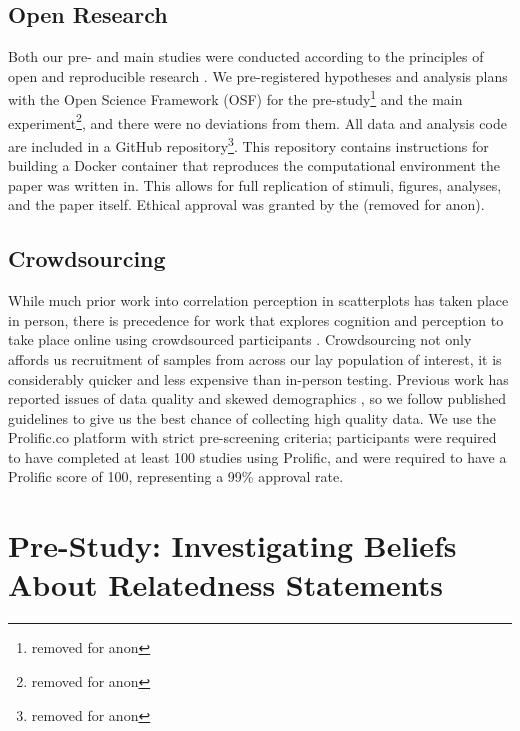 \documentclass[manuscript,screen,review,anonymous]{acmart}
\begin{document}
\subsection{Open Research}\label{sec-open-research}

Both our pre- and main studies were conducted according to the
principles of open and reproducible research \citep{ayris_2018}. We
pre-registered hypotheses and analysis plans with the Open Science
Framework (OSF) for the pre-study\footnote{removed for anon} and the
main experiment\footnote{removed for anon}, and there were no deviations
from them. All data and analysis code are included in a GitHub
repository\footnote{removed for anon}. This repository contains
instructions for building a Docker container \citep{merkel_2014} that
reproduces the computational environment the paper was written in. This
allows for full replication of stimuli, figures, analyses, and the paper
itself. Ethical approval was granted by the (removed for anon).

\subsection{Crowdsourcing}\label{sec-crowdsourcing}

While much prior work into correlation perception in scatterplots has
taken place in person, there is precedence for work that explores
cognition and perception to take place online using crowdsourced
participants \citep{xiong_2022}. Crowdsourcing not only affords us
recruitment of samples from across our lay population of interest, it is
considerably quicker and less expensive than in-person testing. Previous
work has reported issues of data quality and skewed demographics
\citep{chmielewski_2020, charalambides_2021, peer_2021}, so we follow
published guidelines \citep{peer_2021} to give us the best chance of
collecting high quality data. We use the Prolific.co platform
\citep{prolific} with strict pre-screening criteria; participants were
required to have completed at least 100 studies using Prolific, and were
required to have a Prolific score of 100, representing a 99\% approval
rate.

\section{Pre-Study: Investigating Beliefs About Relatedness
Statements}\label{sec-pre-study}
\end{document}
